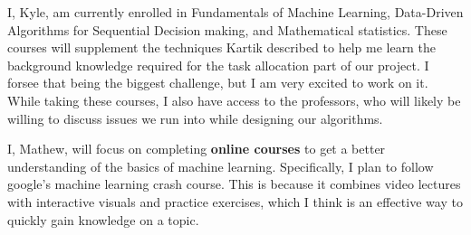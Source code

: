 \documentclass[12pt]{article}
\begin{document}
I, Kyle, am currently enrolled in Fundamentals of Machine Learning, Data-Driven Algorithms for Sequential Decision making, and Mathematical statistics. These courses will supplement the techniques Kartik described to help me learn the background knowledge required for the task allocation part of our project. I forsee that being the biggest challenge, but I am very excited to work on it. While taking these courses, I also have access to the professors, who will likely be willing to discuss issues we run into while designing our algorithms.

I, Mathew, will focus on completing \textbf{online courses} to get a better understanding of the basics of machine learning. Specifically, I plan to follow google's machine learning crash course. This is because it combines video lectures with interactive visuals and practice exercises, which I think is an effective way to quickly gain knowledge on a topic.
\end{document}
